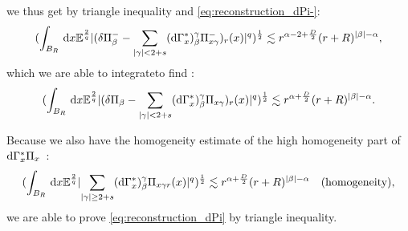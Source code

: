 we thus get by triangle inequality and \eqref{eq:reconstruction_dPi-}:
\begin{equation}
    (\int_{B_R} \,\mathrm{d} x \mathbb{E}^{\frac{2}{q}} \lvert (\delta \Pi^-_\beta - \sum_{\lvert\gamma\rvert< 2+s}(\mathrm{d}\Gamma^*_x)^\gamma_\beta \Pi^-_{x\gamma})_r(x)\rvert^q)^\frac{1}{2} \lesssim r^{\alpha -2+ \frac{D}{2}}(r+R)^{\lvert\beta\rvert-\alpha}, \label{eq:reconstruction_Pi-2}
\end{equation}
which we are able to integrateto find :
\begin{equation}
    (\int_{B_R} \,\mathrm{d} x \mathbb{E}^{\frac{2}{q}} \lvert (\delta \Pi_\beta - \sum_{\lvert\gamma\rvert< 2+s}(\mathrm{d}\Gamma^*_x)^\gamma_\beta \Pi_{x\gamma})_r(x)\rvert^q)^\frac{1}{2} \lesssim r^{\alpha + \frac{D}{2}}(r+R)^{\lvert\beta\rvert-\alpha}.
\end{equation}

Because we also have the homogeneity estimate of the high homogeneity part of $\mathrm{d}\Gamma^*_x \Pi_x$~:
\begin{equation}
    (\int_{B_R} \,\mathrm{d} x \mathbb{E}^{\frac{2}{q}} \lvert\sum_{\lvert\gamma\rvert\geq 2+s}(\mathrm{d}\Gamma^*_x)^\gamma_\beta \Pi_{x\gamma r}(x)\rvert^q)^\frac{1}{2} \lesssim r^{\alpha + \frac{D}{2}}(r+R)^{\lvert\beta\rvert - \alpha} \quad \text{(homogeneity)} \label{eq:homdGPi},
\end{equation} 
we are able to prove \eqref{eq:reconstruction_dPi} by triangle inequality.

